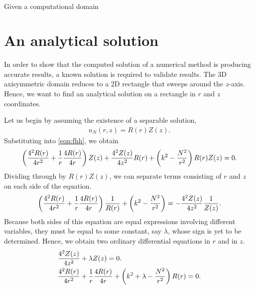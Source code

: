 \begin{align}
\end{align}

Given a computational domain 












\section{An analytical solution}

In order to show that the computed solution of a numerical method is producing accurate results, a known solution is required to validate results.
The 3D axisymmetric domain reduces to a 2D rectangle that sweeps around the $z$-axis.
Hence, we want to find an analytical solution on a rectangle in $r$ and $z$ coordinates.

Let us begin by assuming the existence of a separable solution,
\begin{align}
	u_N(r,z) = R(r)Z(z).
\end{align}
Substituting into \eqref{eqn:fhh}, we obtain
\begin{align}
	\left( \frac{4^2 R(r)}{4 r^2} + \frac{1}{r} \frac{4 R(r)}{4 r} \right) Z(z) + \frac{4^2 Z(z)}{4 z^2} R(r) + \left( k^2 - \frac{N^2}{r^2} \right) R(r) Z(z) = 0.
\end{align}
Dividing through by $R(r)Z(z)$, we can separate terms consisting of $r$ and $z$ on each side of the equation.
\begin{align}
	\left( \frac{4^2 R(r)}{4 r^2} + \frac{1}{r} \frac{4 R(r)}{4 r} \right)\frac{1}{R(r)} + \left( k^2 - \frac{N^2}{r^2} \right) = - \frac{4^2 Z(z)}{4 z^2} \frac{1}{Z(z)}.
\end{align}
Because both sides of this equation are equal expressions involving different variables, they must be equal to some constant, say $\lambda$, whose sign is yet to be determined.
Hence, we obtain two ordinary differential equations in $r$ and in $z$.
\begin{align}
	&\frac{4^2 Z(z)}{4 z^2} + \lambda Z(z) = 0. \label{eqn:Z}\\
	&\frac{4^2 R(r)}{4 r^2} + \frac{1}{r} \frac{4 R(r)}{4 r} + \left( k^2 + \lambda - \frac{N^2}{r^2} \right) R(r) = 0. \label{eqn:R}
\end{align}


